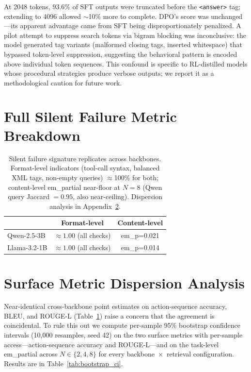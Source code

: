 At 2048 tokens, $93.6\%$ of SFT outputs were truncated before the \texttt{<answer>} tag; extending to 4096 allowed $\sim$10\% more to complete. DPO's score was unchanged---its apparent advantage came from SFT being disproportionately penalized. A pilot attempt to suppress search tokens via bigram blocking was inconclusive: the model generated tag variants (malformed closing tags, inserted whitespace) that bypassed token-level suppression, suggesting the behavioral pattern is encoded above individual token sequences. This confound is specific to RL-distilled models whose procedural strategies produce verbose outputs; we report it as a methodological caution for future work.

\section{Full Silent Failure Metric Breakdown}
\label{app:silent_failure_full}

\begin{table}[h]
\centering
\small
\begin{tabular}{lcc}
\toprule
 & Format-level & Content-level \\
\midrule
Qwen-2.5-3B  & $\approx 1.00$ (all checks) & em\_p=0.021 \\
Llama-3.2-1B & $\approx 1.00$ (all checks) & em\_p=0.014 \\
\bottomrule
\end{tabular}
\caption{Silent failure signature replicates across backbones. Format-level indicators (tool-call syntax, balanced XML tags, non-empty queries) $\approx$100\% for both; content-level em\_partial near-floor at $N\!=\!8$ (Qwen query Jaccard $=0.95$, also near-ceiling). Dispersion analysis in Appendix~\ref{app:dispersion}.}
\label{tab:silent_failure_demo}
\end{table}

\section{Surface Metric Dispersion Analysis}
\label{app:dispersion}

Near-identical cross-backbone point estimates on action-sequence accuracy, BLEU, and ROUGE-L (Table~\ref{tab:silent_failure_demo}) raise a concern that the agreement is coincidental. To rule this out we compute per-sample 95\% bootstrap confidence intervals (10{,}000 resamples, seed 42) on the two surface metrics with per-sample access---action-sequence accuracy and ROUGE-L---and on the task-level em\_partial across $N\!\in\!\{2,4,8\}$ for every backbone~$\times$~retrieval configuration. Results are in Table~\ref{tab:bootstrap_ci}.

